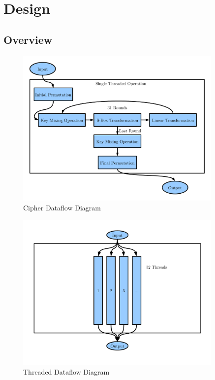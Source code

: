 \section{Design}

\subsection{Overview}


\begin{figure}[H]
\centering
\includegraphics[width=0.9\textwidth]{Design-Overview-Cipher.pdf}
\caption{Cipher Dataflow Diagram}
\end{figure}

\begin{figure}[H]
\centering
\includegraphics[width=0.9\textwidth]{Design-Overview-Threaded.pdf}
\caption{Threaded Dataflow Diagram}
\end{figure}